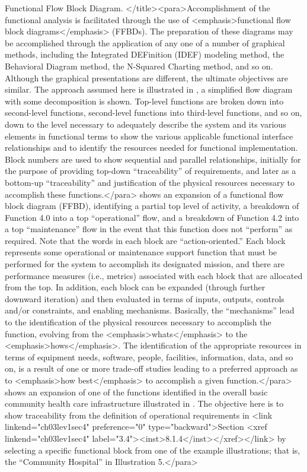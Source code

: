 Functional Flow Block Diagram. </title><para>Accomplishment of the functional analysis is facilitated through the use of <emphasis>functional flow block diagrams</emphasis> (FFBDs). The preparation of these diagrams may be accomplished through the application of any one of a number of graphical methods, including the Integrated DEFinition (IDEF) modeling method, the Behavioral Diagram method, the N-Squared Charting method, and so on. Although the graphical presentations are different, the ultimate objectives are similar. The approach assumed here is illustrated in 
, a simplified flow diagram with some decomposition is shown. Top-level functions are broken down into second-level functions, second-level functions into third-level functions, and so on, down to the level necessary to adequately describe the system and its various elements in functional terms to show the various applicable functional interface relationships and to identify the resources needed for functional implementation. Block numbers are used to show sequential and parallel relationships, initially for the purpose of providing top-down “traceability” of requirements, and later as a bottom-up “traceability” and justification of the physical resources necessary to accomplish these functions.</para>
 shows an expansion of a functional flow block diagram (FFBD), identifying a partial top level of activity, a breakdown of Function 4.0 into a top “operational” flow, and a breakdown of Function 4.2 into a top “maintenance” flow in the event that this function does not “perform” as required. Note that the words in each block are “action-oriented.” Each block represents some operational or maintenance support function that must be performed for the system to accomplish its designated mission, and there are performance measures (i.e., metrics) associated with each block that are allocated from the top. In addition, each block can be expanded (through further downward iteration) and then evaluated in terms of inputs, outputs, controls and/or constraints, and enabling mechanisms. Basically, the “mechanisms” lead to the identification of the physical resources necessary to accomplish the function, evolving from the <emphasis>whats</emphasis> to the <emphasis>hows</emphasis>. The identification of the appropriate resources in terms of equipment needs, software, people, facilities, information, data, and so on, is a result of one or more trade-off studies leading to a preferred approach as to <emphasis>how best</emphasis> to accomplish a given function.</para>
 shows an expansion of one of the functions identified in the overall basic community health care infrastructure illustrated in . The objective here is to show traceability from the definition of operational requirements in <link linkend="ch03lev1sec4" preference="0" type="backward">Section <xref linkend="ch03lev1sec4" label="3.4"><inst>8.1.4</inst></xref></link> by selecting a specific functional block from one of the example illustrations; that is, the “Community Hospital” in Illustration 5.</para>
